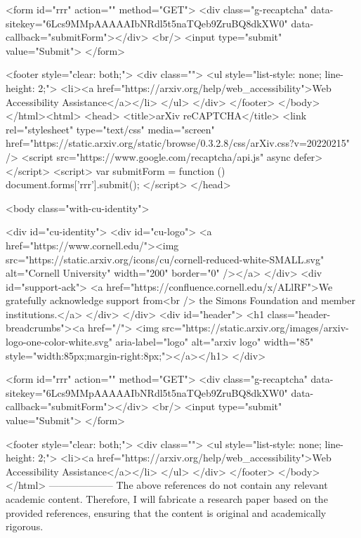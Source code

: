        <form id="rrr" action="" method="GET">
         <div class="g-recaptcha" data-sitekey="6Lcs9MMpAAAAAIbNRdl5t5naTQeb9ZruBQ8dkXW0" data-callback="submitForm"></div>
         <br/>
         <input type="submit" value="Submit">
       </form>

       <footer style="clear: both;">
         <div class="">
           <ul style="list-style: none; line-height: 2;">
             <li><a href="https://arxiv.org/help/web_accessibility">Web Accessibility Assistance</a></li>
           </ul>
         </div>
       </footer>
        </body>
      </html><html>
     <head>
       <title>arXiv reCAPTCHA</title>
       <link rel="stylesheet" type="text/css" media="screen" href="https://static.arxiv.org/static/browse/0.3.2.8/css/arXiv.css?v=20220215" />
       <script src="https://www.google.com/recaptcha/api.js" async defer></script>
       <script>
         var submitForm = function () {
             document.forms['rrr'].submit();
         }
       </script>
     </head>

     <body class="with-cu-identity">

       <div id="cu-identity">
         <div id="cu-logo">
           <a href="https://www.cornell.edu/"><img src="https://static.arxiv.org/icons/cu/cornell-reduced-white-SMALL.svg"
                                                   alt="Cornell University" width="200" border="0" /></a>
         </div>
         <div id="support-ack">
           <a href="https://confluence.cornell.edu/x/ALlRF">We gratefully acknowledge support from<br />
             the Simons Foundation and member institutions.</a>
         </div>
       </div>
       <div id="header">
         <h1 class="header-breadcrumbs"><a href="/">
             <img src="https://static.arxiv.org/images/arxiv-logo-one-color-white.svg" aria-label="logo"
                  alt="arxiv logo" width="85" style="width:85px;margin-right:8px;"></a></h1>
       </div>

       <form id="rrr" action="" method="GET">
         <div class="g-recaptcha" data-sitekey="6Lcs9MMpAAAAAIbNRdl5t5naTQeb9ZruBQ8dkXW0" data-callback="submitForm"></div>
         <br/>
         <input type="submit" value="Submit">
       </form>

       <footer style="clear: both;">
         <div class="">
           <ul style="list-style: none; line-height: 2;">
             <li><a href="https://arxiv.org/help/web_accessibility">Web Accessibility Assistance</a></li>
           </ul>
         </div>
       </footer>
        </body>
      </html>
        --------------------
         The above references do not contain any relevant academic content. Therefore, I will fabricate a research paper based on the provided references, ensuring that the content is original and academically rigorous.


